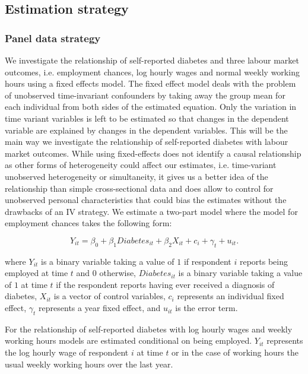 \subsection{\noindent \label{sec:Estimation_Strategy}Estimation strategy}

\subsubsection{Panel data strategy}

We investigate the relationship of self-reported diabetes and three labour
market outcomes, i.e. employment chances, log hourly wages  and normal
weekly working hours using a fixed effects model. The fixed effect model deals with the problem of unobserved time-invariant
confounders by taking away the group mean for each individual from
both sides of the estimated equation. Only the variation in time variant
variables is left to be estimated so that changes in the dependent variable are explained
by changes in the dependent variables. This will be the main way we investigate the relationship of self-reported
diabetes with labour market outcomes. While using fixed-effects
does not identify a causal relationship as other forms of heterogeneity
could affect our estimates, i.e. time-variant unobserved heterogeneity
or simultaneity, it gives us a better idea of the relationship than
simple cross-sectional data and does allow to control for unobserved
personal characteristics that could bias the estimates without the
drawbacks of an \ac{IV} strategy. We estimate a two-part model where
the model for employment chances takes the following form:

\noindent 
\begin{equation}
Y_{it}=\beta_{0}+\beta_{1}Diabetes_{it}+\beta_{2}X_{it}+c_{i}+\gamma_{t}+u_{it}.\label{eq:employed}
\end{equation}


where $Y_{it}$ is a binary variable taking a value of $1$ if respondent
$i$ reports being employed at time $t$ and $0$ otherwise, $Diabetes_{it}$
is a binary variable taking a value of $1$ at time $t$ if the respondent reports
having ever received a diagnosis of diabetes, $X_{it}$ is a vector
of control variables, $c_{i}$ represents an individual fixed effect,
$\gamma_{t}$ represents a year fixed effect, and $u_{it}$ is the
error term.

For the relationship of self-reported diabetes with log hourly wages
and weekly working hours models are estimated conditional on being
employed. $Y_{it}$ represents the log hourly wage of respondent $i$ at time
$t$ or in the case of working hours the usual weekly working hours
over the last year. 


